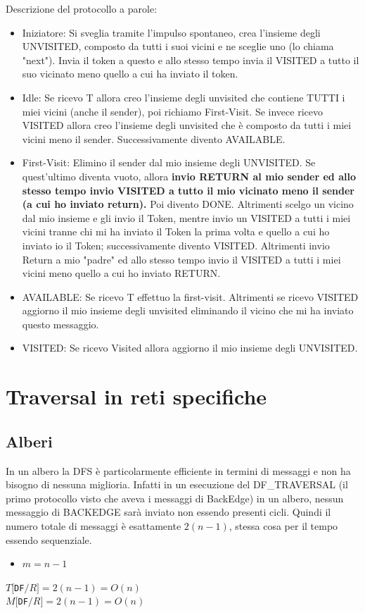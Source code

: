 Descrizione del protocollo a parole:
\begin{itemize}
    \item Iniziatore: Si sveglia tramite l'impulso spontaneo, crea l'insieme degli
          UNVISITED, composto da tutti i suoi vicini e ne sceglie uno (lo chiama
          "next"). Invia il token a questo e allo stesso tempo invia il  VISITED a tutto
          il suo vicinato meno quello a cui ha inviato il token.
    \item Idle: Se ricevo T allora creo l'insieme degli unvisited che contiene
          TUTTI i miei vicini (anche il sender), poi richiamo First-Visit. Se
          invece ricevo VISITED allora creo l'insieme degli unvisited che è
          composto da tutti i miei vicini meno il sender. Successivamente divento
          AVAILABLE.
    \item First-Visit: Elimino il sender dal mio insieme degli UNVISITED. Se
          quest'ultimo diventa vuoto, allora \textbf{invio RETURN al mio sender ed allo
              stesso tempo invio VISITED a tutto il mio vicinato meno il sender (a cui ho
              inviato return).} Poi divento DONE. Altrimenti scelgo un vicino dal mio
          insieme e gli invio il Token, mentre invio un VISITED a tutti i miei vicini
          tranne chi mi ha inviato il Token la prima volta e quello a cui ho inviato io
          il Token; successivamente divento VISITED. Altrimenti invio Return a mio
          "padre" ed allo stesso tempo invio il VISITED a tutti i miei vicini meno
          quello a cui ho inviato RETURN.
    \item AVAILABLE: Se ricevo T effettuo la first-visit. Altrimenti se ricevo
          VISITED aggiorno il mio insieme degli unvisited eliminando il vicino che mi ha
          inviato questo messaggio.
    \item VISITED: Se ricevo Visited allora aggiorno il mio insieme degli
          UNVISITED.
\end{itemize}


\section{Traversal in reti specifiche}
\subsection{Alberi}
In un albero la DFS è particolarmente efficiente in termini di messaggi e non ha
bisogno di nessuna miglioria. Infatti in un esecuzione del DF\_TRAVERSAL (il
primo protocollo visto che aveva i messaggi di BackEdge) in un albero, nessun
messaggio di BACKEDGE sarà inviato non essendo presenti cicli. Quindi il numero
totale di messaggi è esattamente $2(n-1)$, stessa cosa per il tempo essendo
sequenziale.
\begin{itemize}
    \item $m = n -1$
\end{itemize}
\begin{center}
    $T[$\texttt{DF}$/R] = 2(n-1) = O(n)$\\
    $M[$\texttt{DF}$/R] = 2(n-1) = O(n)$
\end{center}
